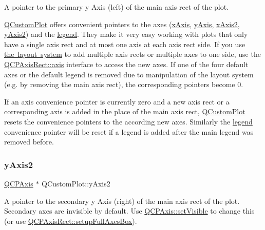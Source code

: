 A pointer to the primary y Axis (left) of the main axis rect of the plot.

\mbox{\hyperlink{class_q_custom_plot}{Q\+Custom\+Plot}} offers convenient pointers to the axes (\mbox{\hyperlink{class_q_custom_plot_a9a79cd0158a4c7f30cbc702f0fd800e4}{x\+Axis}}, \mbox{\hyperlink{class_q_custom_plot_af6fea5679725b152c14facd920b19367}{y\+Axis}}, \mbox{\hyperlink{class_q_custom_plot_ada41599f22cad901c030f3dcbdd82fd9}{x\+Axis2}}, \mbox{\hyperlink{class_q_custom_plot_af13fdc5bce7d0fabd640f13ba805c0b7}{y\+Axis2}}) and the \mbox{\hyperlink{class_q_custom_plot_a4eadcd237dc6a09938b68b16877fa6af}{legend}}. They make it very easy working with plots that only have a single axis rect and at most one axis at each axis rect side. If you use \mbox{\hyperlink{}{the layout system}} to add multiple axis rects or multiple axes to one side, use the \mbox{\hyperlink{class_q_c_p_axis_rect_a583ae4f6d78b601b732183f6cabecbe1}{Q\+C\+P\+Axis\+Rect\+::axis}} interface to access the new axes. If one of the four default axes or the default legend is removed due to manipulation of the layout system (e.\+g. by removing the main axis rect), the corresponding pointers become 0.

If an axis convenience pointer is currently zero and a new axis rect or a corresponding axis is added in the place of the main axis rect, \mbox{\hyperlink{class_q_custom_plot}{Q\+Custom\+Plot}} resets the convenience pointers to the according new axes. Similarly the \mbox{\hyperlink{class_q_custom_plot_a4eadcd237dc6a09938b68b16877fa6af}{legend}} convenience pointer will be reset if a legend is added after the main legend was removed before. \mbox{\label{class_q_custom_plot_af13fdc5bce7d0fabd640f13ba805c0b7}} 
\subsubsection{\texorpdfstring{yAxis2}{yAxis2}}
{\footnotesize\ttfamily \mbox{\hyperlink{class_q_c_p_axis}{Q\+C\+P\+Axis}} $\ast$ Q\+Custom\+Plot\+::y\+Axis2}

A pointer to the secondary y Axis (right) of the main axis rect of the plot. Secondary axes are invisible by default. Use \mbox{\hyperlink{class_q_c_p_layerable_a3bed99ddc396b48ce3ebfdc0418744f8}{Q\+C\+P\+Axis\+::set\+Visible}} to change this (or use \mbox{\hyperlink{class_q_c_p_axis_rect_a5fa906175447b14206954f77fc7f1ef4}{Q\+C\+P\+Axis\+Rect\+::setup\+Full\+Axes\+Box}}).

